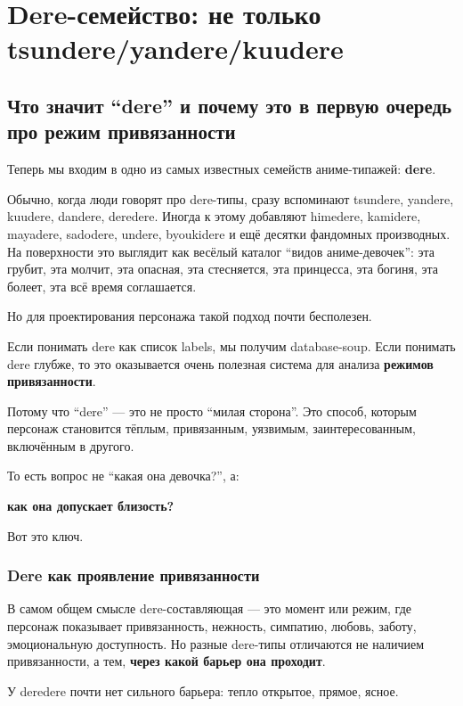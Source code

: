\setcounter{chapter}{2}
\chapter{Dere-семейство: не только tsundere/yandere/kuudere}

\setcounter{section}{0}
\section{Что значит “dere” и почему это в первую очередь про режим привязанности}

Теперь мы входим в одно из самых известных семейств аниме-типажей:
\textbf{dere}.

Обычно, когда люди говорят про dere-типы, сразу вспоминают tsundere,
yandere, kuudere, dandere, deredere. Иногда к этому добавляют himedere,
kamidere, mayadere, sadodere, undere, byoukidere и ещё десятки фандомных
производных. На поверхности это выглядит как весёлый каталог ``видов
аниме-девочек'': эта грубит, эта молчит, эта опасная, эта стесняется,
эта принцесса, эта богиня, эта болеет, эта всё время соглашается.

Но для проектирования персонажа такой подход почти бесполезен.

Если понимать dere как список labels, мы получим database-soup. Если
понимать dere глубже, то это оказывается очень полезная система для
анализа \textbf{режимов привязанности}.

Потому что ``dere'' --- это не просто ``милая сторона''. Это способ,
которым персонаж становится тёплым, привязанным, уязвимым,
заинтересованным, включённым в другого.

То есть вопрос не ``какая она девочка?'', а:

\textbf{как она допускает близость?}

Вот это ключ.

\subsection*{Dere как проявление привязанности}

В самом общем смысле dere-составляющая --- это момент или режим, где
персонаж показывает привязанность, нежность, симпатию, любовь, заботу,
эмоциональную доступность. Но разные dere-типы отличаются не наличием
привязанности, а тем, \textbf{через какой барьер она проходит}.

У deredere почти нет сильного барьера: тепло открытое, прямое, ясное.

